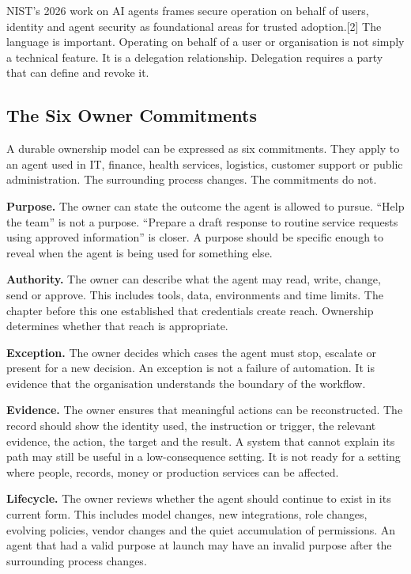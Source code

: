 NIST's 2026 work on AI agents frames secure operation on behalf of
users, identity and agent security as foundational areas for trusted
adoption.{[}2{]} The language is important. Operating on behalf of a
user or organisation is not simply a technical feature. It is a
delegation relationship. Delegation requires a party that can define and
revoke it.

\subsection{The Six Owner Commitments}\label{the-six-owner-commitments}

A durable ownership model can be expressed as six commitments. They
apply to an agent used in IT, finance, health services, logistics,
customer support or public administration. The surrounding process
changes. The commitments do not.

\textbf{Purpose.} The owner can state the outcome the agent is allowed
to pursue. ``Help the team'' is not a purpose. ``Prepare a draft
response to routine service requests using approved information'' is
closer. A purpose should be specific enough to reveal when the agent is
being used for something else.

\textbf{Authority.} The owner can describe what the agent may read,
write, change, send or approve. This includes tools, data, environments
and time limits. The chapter before this one established that
credentials create reach. Ownership determines whether that reach is
appropriate.

\textbf{Exception.} The owner decides which cases the agent must stop,
escalate or present for a new decision. An exception is not a failure of
automation. It is evidence that the organisation understands the
boundary of the workflow.

\textbf{Evidence.} The owner ensures that meaningful actions can be
reconstructed. The record should show the identity used, the instruction
or trigger, the relevant evidence, the action, the target and the
result. A system that cannot explain its path may still be useful in a
low-consequence setting. It is not ready for a setting where people,
records, money or production services can be affected.

\textbf{Lifecycle.} The owner reviews whether the agent should continue
to exist in its current form. This includes model changes, new
integrations, role changes, evolving policies, vendor changes and the
quiet accumulation of permissions. An agent that had a valid purpose at
launch may have an invalid purpose after the surrounding process
changes.

